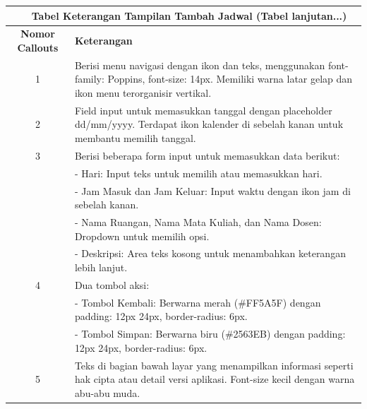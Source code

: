\begin{enumerate}
\begin{longtable}{c p{}}
		      \multicolumn{2}{c}{\small\tablename\ \thetable\ {Tabel Keterangan Tampilan Tambah Jadwal} \space (Tabel lanjutan...)}                                                                   \\
		      \hline
		      \textbf{Nomor Callouts} & \textbf{Keterangan}                                                                                                                                           \\
		      \hline
		      \endhead

		      1                       & Berisi menu navigasi dengan ikon dan teks, menggunakan font-family: Poppins, font-size: 14px. Memiliki warna latar gelap dan ikon menu terorganisir vertikal. \\
		      2                       & Field input untuk memasukkan tanggal dengan placeholder dd/mm/yyyy. Terdapat ikon kalender di sebelah kanan untuk membantu memilih tanggal.                   \\
		      3                       & Berisi beberapa form input untuk memasukkan data berikut:                                                                                                     \\
		                              & - Hari: Input teks untuk memilih atau memasukkan hari.                                                                                                        \\
		                              & - Jam Masuk dan Jam Keluar: Input waktu dengan ikon jam di sebelah kanan.                                                                                     \\
		                              & - Nama Ruangan, Nama Mata Kuliah, dan Nama Dosen: Dropdown untuk memilih opsi.                                                                                \\
		                              & - Deskripsi: Area teks kosong untuk menambahkan keterangan lebih lanjut.                                                                                      \\
		      4                       & Dua tombol aksi:                                                                                                                                              \\
		                              & - Tombol Kembali: Berwarna merah (\#FF5A5F) dengan padding: 12px 24px, border-radius: 6px.                                                                    \\
		                              & - Tombol Simpan: Berwarna biru (\#2563EB) dengan padding: 12px 24px, border-radius: 6px.                                                                      \\
		      5                       & Teks di bagian bawah layar yang menampilkan informasi seperti hak cipta atau detail versi aplikasi. Font-size kecil dengan warna abu-abu muda.                \\
		      \hline
	      \end{longtable}


\end{enumerate}
